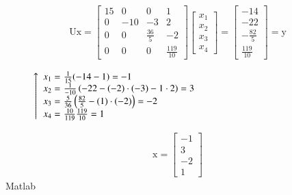 \documentclass[10pt,a4paper]{article}
\begin{document}
	\begin{figure}[htbp]
		\centering
		\begin{minipage}{0.4\linewidth}
			\begin{align*}
			\text{Ux}=
			\begin{bmatrix}
				15 & 0   & 0            & 1              \\
				0  & -10 & -3           & 2              \\
				0  & 0   & \frac{36}{5} & -2             \\
				0  & 0   & 0            & \frac{119}{10}
			\end{bmatrix}
			\begin{bmatrix}
			x_1 \\
			x_2 \\
			x_3 \\
			x_4
			\end{bmatrix}
			= \begin{bmatrix} -14 \\ -22 \\ -\frac{82}{5}  \\ \frac{119}{10} \end{bmatrix}
			= \text{y}
			\end{align*}
		\end{minipage}
		\begin{minipage}{0.4\linewidth}
			\vspace{0.25cm}
			$\left\uparrow
			\begin{array}{rl}
			x_1=&\!\!\!\! \frac{1}{15}(-14-1) = -1 \\
			x_2=&\!\!\!\!  \frac{1}{-10} \left(-22-(-2)\cdot(-3)-1\cdot2 \right) = 3 \\
			x_3=&\!\!\!\! \frac{5}{36}\left( \frac{82}{5}-(1)\cdot(-2) \right) = -2\\
			x_4=&\!\!\!\! \frac{10}{119} \frac{119}{10} = 1
			\end{array}
			\right.$
		\end{minipage}
	\end{figure}
	\begin{align*}
		\text{x} = \begin{bmatrix}
		-1 \\
		3 \\
		-2 \\
		1
		\end{bmatrix}
	\end{align*}
	\newpage
	Matlab
	\begin{mdframed}[linewidth=0pt,backgroundcolor=gray!10]
		
	\end{mdframed}
\end{document}
